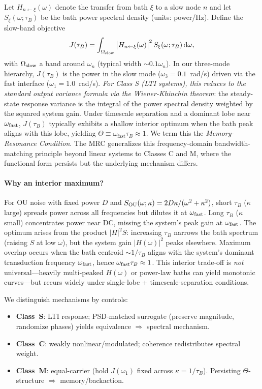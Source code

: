 \documentclass[11pt,letterpaper]{article}
\DeclareRobustCommand{\classS}{\textbf{Class~S}\xspace}
\DeclareRobustCommand{\classC}{\textbf{Class~C}\xspace}
\DeclareRobustCommand{\classM}{\textbf{Class~M}\xspace}
\begin{document}
Let $H_{n\leftarrow\xi}(\omega)$ denote the transfer from bath $\xi$ to a slow node $n$ and let $S_\xi(\omega;\tau_B)$ be the bath power spectral density (units: power/Hz). Define the slow-band objective
\begin{equation}
J(\tau_B) = \int_{\Omega_{\rm slow}} \big|H_{n\leftarrow\xi}(\omega)\big|^2\, S_\xi(\omega;\tau_B)\, \mathrm{d}\omega,
\end{equation}
with $\Omega_{\rm slow}$ a band around $\omega_n$ (typical width $\sim 0.1\omega_n$). In our three-mode hierarchy, $J(\tau_B)$ is the power in the slow mode ($\omega_3=0.1$~rad/s) driven via the fast interface ($\omega_1=1.0$~rad/s). \emph{For Class S (LTI systems), this reduces to the standard output variance formula via the Wiener-Khinchin theorem}: the steady-state response variance is the integral of the power spectral density weighted by the squared system gain. Under timescale separation and a dominant lobe near $\omega_{\rm fast}$, $J(\tau_B)$ typically exhibits a shallow interior optimum when the bath peak aligns with this lobe, yielding $\Theta \equiv \omega_{\mathrm{fast}} \tau_B \approx 1$. We term this the \emph{Memory-Resonance Condition}. The MRC generalizes this frequency-domain bandwidth-matching principle beyond linear systems to Classes C and M, where the functional form persists but the underlying mechanism differs.

\paragraph{Why an interior maximum?}
For OU noise with fixed power $D$ and $S_{\rm OU}(\omega;\kappa) = 2D\kappa/(\omega^2+\kappa^2)$, short $\tau_B$ ($\kappa$ large) spreads power across all frequencies but dilutes it at $\omega_{\rm fast}$. Long $\tau_B$ ($\kappa$ small) concentrates power near DC, missing the system's peak gain at $\omega_{\rm fast}$. The optimum arises from the product $|H|^2 S$: increasing $\tau_B$ narrows the bath spectrum (raising $S$ at low $\omega$), but the system gain $|H(\omega)|^2$ peaks elsewhere. Maximum overlap occurs when the bath centroid $\sim 1/\tau_B$ aligns with the system's dominant transduction frequency $\omega_{\rm fast}$, hence $\omega_{\rm fast} \tau_B \approx 1$. This interior trade-off is \emph{not} universal---heavily multi-peaked $H(\omega)$ or power-law baths can yield monotonic curves---but recurs widely under single-lobe + timescale-separation conditions.

We distinguish mechanisms by controls:
\begin{itemize}
\item \classS: LTI response; PSD-matched surrogate (preserve magnitude, randomize phases) yields equivalence $\Rightarrow$ spectral mechanism.
\item \classC: weakly nonlinear/modulated; coherence redistributes spectral weight.
\item \classM: equal-carrier (hold $J(\omega_1)$ fixed across $\kappa=1/\tau_B$). Persisting $\Theta$-structure $\Rightarrow$ memory/backaction.
\end{itemize}
\end{document}
